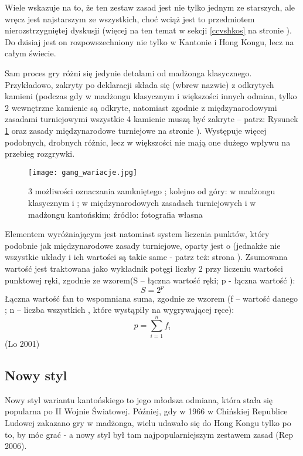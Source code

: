 Wiele wskazuje na to, że ten zestaw zasad jest nie tylko jednym ze starszych,
ale wręcz jest najstarszym ze wszystkich, choć wciąż jest to przedmiotem
nierozstrzygniętej dyskusji (więcej na ten temat w sekcji \ref{ccvshkos} na
stronie \pageref{ccvshkos}). Do dzisiaj jest on rozpowszechniony nie tylko w
Kantonie i Hong Kongu, lecz na całym świecie.

Sam proces gry różni się jedynie detalami od madżonga klasycznego.
Przykładowo, zakryty  po deklaracji składa się (wbrew nazwie) z
odkrytych kamieni (podczas gdy w madżongu klasycznym i większości innych
odmian, tylko 2 wewnętrzne kamienie są odkryte, natomiast zgodnie z
międzynarodowymi zasadami turniejowymi wszystkie 4 kamienie muszą być zakryte
-- patrz: Rysunek \ref{fig:closed_gang_options} oraz zasady międzynarodowe
turniejowe na stronie \pageref{closed_gang}).
Występuje więcej podobnych, drobnych różnic, lecz w większości nie mają one dużego wpływu na przebieg
rozgrywki.

\begin{figure}[H]
  \centering
  \texttt{[image: gang\_wariacje.jpg]}
  \caption{3 możliwości oznaczania zamkniętego ; kolejno od góry:
  w madżongu klasycznym i ; w międzynarodowych zasadach
  turniejowych i w madżongu kantońskim; źródło: fotografia własna}
  \label{fig:closed_gang_options}
\end{figure}

Elementem wyróżniającym jest natomiast system liczenia punktów, który podobnie
jak międzynarodowe zasady turniejowe, oparty jest o  (jednakże
nie wszystkie układy i ich wartości są takie same - patrz też: strona
\pageref{fan}). Zsumowana wartość  jest traktowana jako wykładnik
potęgi liczby 2 przy liczeniu wartości punktowej ręki, zgodnie ze wzorem(S --
łączna wartość ręki; p - łączna wartość ):
	\begin{equation*}
		S = 2^{p}
		\label{hkos_scoring:point_score}
	\end{equation*}
Łączna wartość fan to wspomniana suma, zgodnie ze wzorem (f -- wartość danego
; n -- liczba wszystkich , które wystąpiły na
wygrywającej ręce):
	\begin{equation*}
		p = \sum\limits_{i=1}^n f_{i}
		\label{hkos_scoring:fan_score}
	\end{equation*}
(Lo 2001)

\subsection{Nowy styl}
Nowy styl wariantu kantońskiego to jego młodsza odmiana, która stała się
popularna po II Wojnie Światowej. Później, gdy w 1966 w Chińskiej Republice
Ludowej zakazano gry w madżonga, wielu udawało się do Hong Kongu tylko po to, by
móc grać - a nowy styl był tam najpopularniejszym zestawem zasad (Rep 2006).

